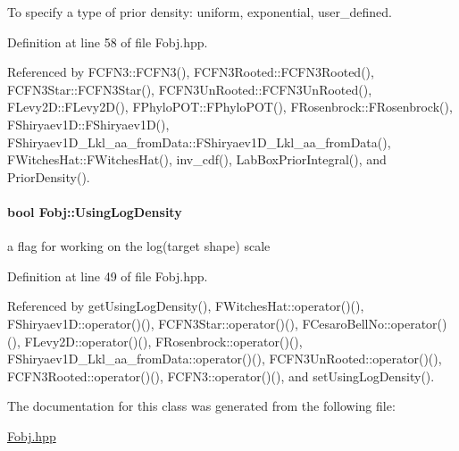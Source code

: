 \-To specify a type of prior density\-: uniform, exponential, user\-\_\-defined. 



\-Definition at line 58 of file \-Fobj.\-hpp.



\-Referenced by \-F\-C\-F\-N3\-::\-F\-C\-F\-N3(), \-F\-C\-F\-N3\-Rooted\-::\-F\-C\-F\-N3\-Rooted(), \-F\-C\-F\-N3\-Star\-::\-F\-C\-F\-N3\-Star(), \-F\-C\-F\-N3\-Un\-Rooted\-::\-F\-C\-F\-N3\-Un\-Rooted(), \-F\-Levy2\-D\-::\-F\-Levy2\-D(), \-F\-Phylo\-P\-O\-T\-::\-F\-Phylo\-P\-O\-T(), \-F\-Rosenbrock\-::\-F\-Rosenbrock(), \-F\-Shiryaev1\-D\-::\-F\-Shiryaev1\-D(), \-F\-Shiryaev1\-D\-\_\-\-Lkl\-\_\-aa\-\_\-from\-Data\-::\-F\-Shiryaev1\-D\-\_\-\-Lkl\-\_\-aa\-\_\-from\-Data(), \-F\-Witches\-Hat\-::\-F\-Witches\-Hat(), inv\-\_\-cdf(), \-Lab\-Box\-Prior\-Integral(), and \-Prior\-Density().

\hypertarget{classFobj_acf1d6b659549cea75e54582668ea7c3b}{
\paragraph[{\-Using\-Log\-Density}]{\setlength{\rightskip}{0pt plus 5cm}bool {\bf \-Fobj\-::\-Using\-Log\-Density}}}\label{classFobj_acf1d6b659549cea75e54582668ea7c3b}


a flag for working on the log(target shape) scale 



\-Definition at line 49 of file \-Fobj.\-hpp.



\-Referenced by get\-Using\-Log\-Density(), \-F\-Witches\-Hat\-::operator()(), \-F\-Shiryaev1\-D\-::operator()(), \-F\-C\-F\-N3\-Star\-::operator()(), \-F\-Cesaro\-Bell\-No\-::operator()(), \-F\-Levy2\-D\-::operator()(), \-F\-Rosenbrock\-::operator()(), \-F\-Shiryaev1\-D\-\_\-\-Lkl\-\_\-aa\-\_\-from\-Data\-::operator()(), \-F\-C\-F\-N3\-Un\-Rooted\-::operator()(), \-F\-C\-F\-N3\-Rooted\-::operator()(), \-F\-C\-F\-N3\-::operator()(), and set\-Using\-Log\-Density().



\-The documentation for this class was generated from the following file\-:\begin{DoxyCompactItemize}
\item 
\hyperlink{Fobj_8hpp}{\-Fobj.\-hpp}\end{DoxyCompactItemize}
